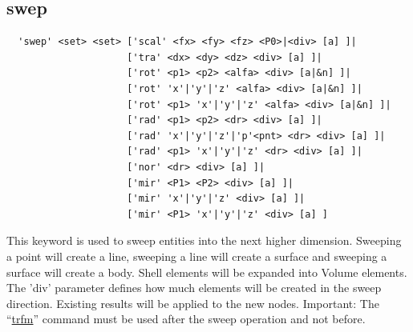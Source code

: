 \documentclass{article}
\providecommand{\htmlref}[2]{\hyperref[#2]{#1}}
\begin{document}
\subsection{\label{swep}swep}
\begin{verbatim}
  'swep' <set> <set> ['scal' <fx> <fy> <fz> <P0>|<div> [a] ]|
                     ['tra' <dx> <dy> <dz> <div> [a] ]|
                     ['rot' <p1> <p2> <alfa> <div> [a|&n] ]|
                     ['rot' 'x'|'y'|'z' <alfa> <div> [a|&n] ]|
                     ['rot' <p1> 'x'|'y'|'z' <alfa> <div> [a|&n] ]|
                     ['rad' <p1> <p2> <dr> <div> [a] ]|
                     ['rad' 'x'|'y'|'z'|'p'<pnt> <dr> <div> [a] ]|
                     ['rad' <p1> 'x'|'y'|'z' <dr> <div> [a] ]|
                     ['nor' <dr> <div> [a] ]|
                     ['mir' <P1> <P2> <div> [a] ]|
                     ['mir' 'x'|'y'|'z' <div> [a] ]|
                     ['mir' <P1> 'x'|'y'|'z' <div> [a] ] 
\end{verbatim}
This keyword is used to sweep entities into the next higher dimension. Sweeping a point will create a line, sweeping a line will create a surface and sweeping a surface will create a body. Shell elements will be expanded into Volume elements. The 'div' parameter defines how much elements will be created in the sweep direction. Existing results will be applied to the new nodes. Important: The ``\htmlref{trfm}{trfm}'' command must be used after the sweep operation and not before.
\end{document}
